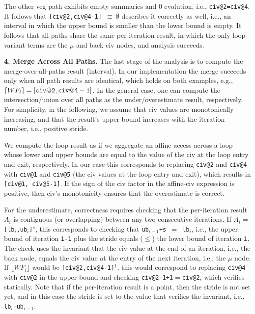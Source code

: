 \documentclass[10pt,nocopyrightspace]{sigplanconf}
\begin{document}
The other {\sc veg} path exhibits empty summaries and $0$ evolution,
i.e., {\tt civ@2=civ@4}. 
It follows that {\tt [civ@2,civ@4-1] $\equiv \ \emptyset$}  
describes it correctly as well, i.e., an interval in which the upper bound 
is smaller than the lower bound is empty.
  It follows that all paths share the same per-iteration result, 
in which the only loop-variant terms are the $\mu$ and back {\sc civ} nodes, 
and analysis succeeds.

\vspace{1ex}
\enlargethispage{\baselineskip}

{\bf 4. Merge Across All Paths.} 
%
The last stage of the analysis is to compute the merge-over-all-paths result (interval).
In our implementation the merge succeeds only when all path results are 
identical, which holds on both examples, e.g., $\lceil WF_i \rceil = {\tt [civ@2,civ@4-1]}$.
In the general case, one can compute the intersection/union over all paths as the  
under/overestimate result, respectively.
For simplicity, in the following, we assume that {\sc civ} values are monotonically 
increasing, and that the result's upper bound increases with the iteration number,
i.e., positive stride. 


We compute the loop result as if we aggregate an affine access
across a loop whose lower and upper bounds are equal to the value of the 
{\sc civ} at the loop entry and exit, respectively.  
%
In our case this corresponds to replacing {\tt civ@2} and {\tt civ@4} 
with {\tt civ@1} and {\tt civ@5} (the {\sc civ} values at the loop entry 
and exit), which results in
{\tt [civ@1, civ@5-1]}.   If the sign of the {\sc civ} factor in
the affine-{\sc civ} expression is positive, then {\sc civ}'s
monotonicity ensures that the overestimate is correct. 

For the underestimate, correctness requires checking that the
per-iteration result $A_i$ is contiguous (or overlapping) 
between any two consecutive iterations. If $A_i=${\tt[lb$_i$,ub$_i$]$^s$},
this corresponds to checking that {\tt ub$_{i-1}$+s $=$ lb$_i$},
i.e., the upper bound of iteration {\tt i-1} plus the stride equals ($\leq$) 
the lower bound of iteration {\tt i}.
%
The check uses the invariant that the {\sc civ} value  
at the end of an iteration, i.e., the back node, equals 
the {\sc civ} value at the entry of the next iteration,
i.e., the $\mu$ node.
%
If $\lfloor WF_i \rfloor$ would be {\tt [{\tt civ@2},{\tt civ@4}-1]$^1$},
this would correspond to replacing {\tt civ@4} with {\tt civ@2} in the upper 
bound and checking {\tt civ@2-1+1$=$civ@2}, which verifies statically. 
%
Note that if the per-iteration result is a point, then the stride is 
not set yet, and in this case the stride is set to the value that 
verifies the invariant, i.e., {\tt lb$_i$-ub$_{i-1}$}.
\end{document}
